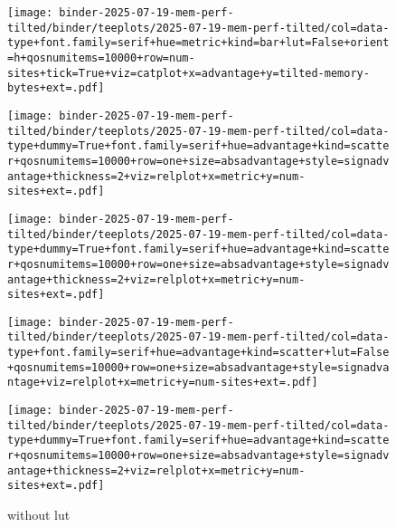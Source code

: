 \begin{figure*}

\begin{subfigure}{\textwidth}
\texttt{[image: binder-2025-07-19-mem-perf-tilted/binder/teeplots/2025-07-19-mem-perf-tilted/col=data-type+font.family=serif+hue=metric+kind=bar+lut=False+orient=h+qosnumitems=10000+row=num-sites+tick=True+viz=catplot+x=advantage+y=tilted-memory-bytes+ext=.pdf]}

\vspace{-1ex}

\texttt{[image: binder-2025-07-19-mem-perf-tilted/binder/teeplots/2025-07-19-mem-perf-tilted/col=data-type+dummy=True+font.family=serif+hue=advantage+kind=scatter+qosnumitems=10000+row=one+size=absadvantage+style=signadvantage+thickness=2+viz=relplot+x=metric+y=num-sites+ext=.pdf]}

\vspace{-3ex}

\texttt{[image: binder-2025-07-19-mem-perf-tilted/binder/teeplots/2025-07-19-mem-perf-tilted/col=data-type+dummy=True+font.family=serif+hue=advantage+kind=scatter+qosnumitems=10000+row=one+size=absadvantage+style=signadvantage+thickness=2+viz=relplot+x=metric+y=num-sites+ext=.pdf]}

\vspace{-1.2ex}

\texttt{[image: binder-2025-07-19-mem-perf-tilted/binder/teeplots/2025-07-19-mem-perf-tilted/col=data-type+font.family=serif+hue=advantage+kind=scatter+lut=False+qosnumitems=10000+row=one+size=absadvantage+style=signadvantage+viz=relplot+x=metric+y=num-sites+ext=.pdf]}

\vspace{-2.8ex}

\texttt{[image: binder-2025-07-19-mem-perf-tilted/binder/teeplots/2025-07-19-mem-perf-tilted/col=data-type+dummy=True+font.family=serif+hue=advantage+kind=scatter+qosnumitems=10000+row=one+size=absadvantage+style=signadvantage+thickness=2+viz=relplot+x=metric+y=num-sites+ext=.pdf]}

\vspace{-1.5ex}

\caption{without lut}
\label{fig:mem-perf-tilted:nolut}
\end{subfigure}


\end{figure*}
